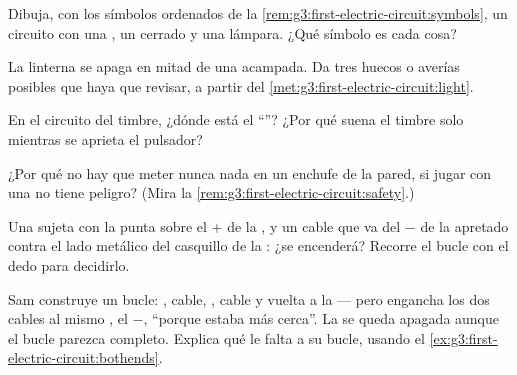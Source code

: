 \begin{exercise}[$\star$]\label{exo:g3:first-electric-circuit:5}
Dibuja, con los símbolos ordenados de la
\cref{rem:g3:first-electric-circuit:symbols}, un circuito con una
, un  cerrado y una lámpara. ¿Qué símbolo es
cada cosa?
\end{exercise}

\begin{exercise}[$\star$]\label{exo:g3:first-electric-circuit:6}
La linterna se apaga en mitad de una acampada. Da tres huecos o
averías posibles que haya que revisar, a partir del
\cref{met:g3:first-electric-circuit:light}.
\end{exercise}

\begin{exercise}[$\star$]\label{exo:g3:first-electric-circuit:7}
En el circuito del timbre, ¿dónde está el ``''? ¿Por qué
suena el timbre solo mientras se aprieta el pulsador?
\end{exercise}

\begin{exercise}[$\star$]\label{exo:g3:first-electric-circuit:8}
¿Por qué no hay que meter nunca nada en un enchufe de la pared, si
jugar con una  no tiene peligro? (Mira la
\cref{rem:g3:first-electric-circuit:safety}.)
\end{exercise}

\begin{exercise}[$\star$]\label{exo:g3:first-electric-circuit:9}
Una  sujeta con la punta sobre el  $+$ de la
, y un cable que va del  $-$ de la  apretado
contra el lado metálico del casquillo de la : ¿se encenderá?
Recorre el bucle con el dedo para decidirlo.
\end{exercise}

\begin{exercise}[$\star\star$]\label{exo:g3:first-electric-circuit:10}
Sam construye un bucle: , cable, , cable y vuelta a
la  --- pero engancha los dos cables al mismo , el $-$,
``porque estaba más cerca''. La  se queda apagada aunque el
bucle parezca completo. Explica qué le falta a su bucle, usando el
\cref{ex:g3:first-electric-circuit:bothends}.
\end{exercise}

